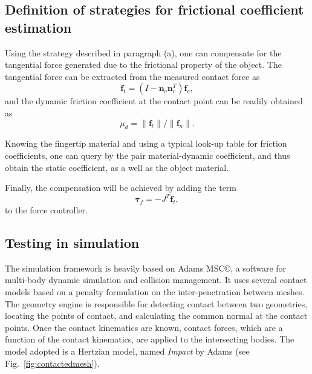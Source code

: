 

\subsection{Definition of strategies for frictional coefficient estimation}
Using the strategy described in paragraph (a), one can compensate for the tangential force generated due to the frictional property of the object. The tangential force can be extracted from the measured contact force as
\begin{equation}
    \mathbf{f}_t = (I-\mathbf{n}_{c}\mathbf{n}^T_{c})\mathbf{f}_c,
\end{equation}
and the dynamic friction coefficient at the contact point can be readily obtained as
\begin{equation}
    \mu_{d} = \lVert{\mathbf{f}_{t}}\rVert/\lVert{\mathbf{f}_{n}}\rVert.
\end{equation}

Knowing the fingertip material and using a typical look-up table for friction coefficients, one can query by the pair material-dynamic coefficient, and thus obtain the static coefficient, as a well as the object material.

Finally, the compensation will be achieved by adding the term
\begin{equation}
    \boldsymbol{\tau}_f=-J^T \mathbf{f}_t,
\end{equation}
to the force controller.

\subsection{Testing in simulation}
The simulation framework is heavily based on Adams MSC\copyright, a software for multi-body dynamic simulation and collision management. It uses several contact models based on a penalty formulation on the inter-penetration between meshes. The geometry engine is responsible for detecting contact between two geometries, locating the points of contact, and calculating the common normal at the contact points. Once the contact kinematics are known, contact forces, which are a function of the contact kinematics, are applied to the intersecting bodies. The model adopted is a Hertzian model, named \emph{Impact} by Adams (see Fig.~\ref{fig:contactedmesh}).

